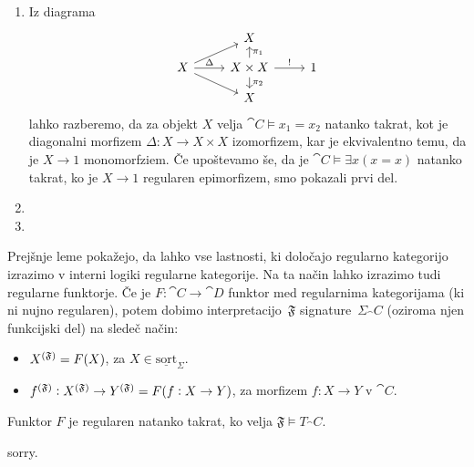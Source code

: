 \documentclass[../kategoricna_logika.tex]{subfiles}
\begin{document}
\begin{dokaz}
  \begin{enumerate}[label=(\roman*)]
    \item Iz diagrama
      \begin{equation*}
      \begin{tikzcd}[row sep=small]
        & X & \\
        X \ar[ur] \ar[r, "\Delta"] \ar[dr] & X \times X \ar[u, "\pi_1"'] \ar[d, "\pi_2"] \ar[r, "!"] & 1 \\
        & X & 
      \end{tikzcd}
      \end{equation*}
      lahko razberemo, da za objekt $X$ velja 
      $\cat{C} \models x_1 = x_2$ natanko takrat, kot je diagonalni morfizem
      $\Delta : X \to X \times X$ izomorfizem, kar je ekvivalentno temu, da je $X \to 1$ monomorfziem.
      Če upoštevamo še, da je $\cat{C} \models \exists x (x = x)$ natanko takrat,
      ko je $X \to 1$ regularen epimorfizem, smo pokazali prvi del.
      
    \item

    \item 
  \end{enumerate}
\end{dokaz}

\noindent
Prejšnje leme pokažejo, da lahko vse lastnosti, ki določajo regularno kategorijo izrazimo v interni logiki regularne kategorije.
Na ta način lahko izrazimo tudi regularne funktorje.
Če je $F : \cat{C} \to \cat{D}$ funktor med regularnima kategorijama (ki ni nujno regularen),
potem dobimo interpretacijo~$\mathfrak{F}$ signature~$\Sigma_\cat{C}$ (oziroma njen funkcijski del) na sledeč način:
\begin{itemize}
  \item $\interp[\mathfrak{F}]{X} = F(X)$, za $X \in \underline{\mathrm{sort}}_{\Sigma}$.
  \item $\interp[\mathfrak{F}]{f} : \interp[\mathfrak{F}]{X} \to \interp[\mathfrak{F}]{Y} = F(f : X \to Y)$, za morfizem $f: X \to Y$ v $\cat{C}$.
\end{itemize}
\begin{lema}
  Funktor $F$ je regularen natanko takrat, ko velja $\mathfrak{F} \models T_\cat{C}$.
\end{lema}
\begin{dokaz}
  sorry.
\end{dokaz}
%
\end{document}
